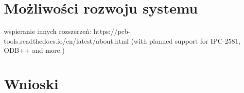\documentclass[brudnopis]{xmgr}
\begin{document}
\section{Możliwości rozwoju systemu}
wspieranie innych rozszerzeń:
https://pcb-tools.readthedocs.io/en/latest/about.html
(with planned support for IPC-2581, ODB++ and more.)

\section{Wnioski}



\summary






\listoftables

\listoffigures

\oswiadczenie
\end{document}
